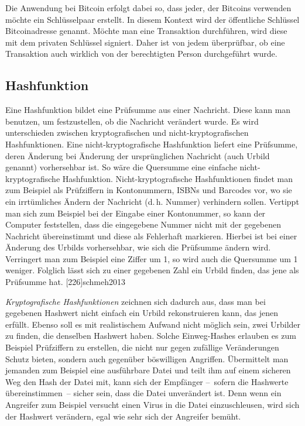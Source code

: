 Die Anwendung bei Bitcoin erfolgt dabei so, dass jeder, der Bitcoins verwenden möchte ein Schlüsselpaar erstellt.
In diesem Kontext wird der öffentliche Schlüssel Bitcoinadresse genannt.
Möchte man eine Transaktion durchführen, wird diese mit dem privaten Schlüssel signiert.
Daher ist von jedem überprüfbar, ob eine Transaktion auch wirklich von der berechtigten Person durchgeführt wurde.

\subsection{Hashfunktion}

Eine Hashfunktion bildet eine Prüfsumme aus einer Nachricht.
Diese kann man benutzen, um festzustellen, ob die Nachricht verändert wurde.
Es wird unterschieden zwischen kryptografischen und nicht-kryptografischen Hashfunktionen.
Eine nicht-kryptografische Hashfunktion liefert eine Prüfsumme, deren Änderung bei Änderung der ursprünglichen Nachricht (auch Urbild genannt) vorhersehbar ist.
So wäre die Quersumme eine einfache nicht-kryptografische Hashfunktion.
Nicht-kryptografische Hashfunktionen findet man zum Beispiel als Prüfziffern in Kontonummern, ISBNs und Barcodes vor, wo sie ein irrtümliches Ändern der Nachricht (d.\,h. Nummer) verhindern sollen.
Vertippt man sich zum Beispiel bei der Eingabe einer Kontonummer, so kann der Computer feststellen, dass die eingegebene Nummer nicht mit der gegebenen Nachricht übereinstimmt und diese als Fehlerhaft markieren.
Hierbei ist bei einer Änderung des Urbilds vorhersehbar, wie sich die Prüfsumme ändern wird.
Verringert man zum Beispiel eine Ziffer um 1, so wird auch die Quersumme um 1 weniger.
Folglich lässt sich zu einer gegebenen Zahl ein Urbild finden, das jene als Prüfsumme hat.
[226]{schmeh2013}

\emph{Kryptografische Hashfunktionen} zeichnen sich dadurch aus, dass man bei gegebenen Hashwert nicht einfach ein Urbild rekonstruieren kann, das jenen erfüllt.
Ebenso soll es mit realistischem Aufwand nicht möglich sein, zwei Urbilder zu finden, die denselben Hashwert haben.
Solche Einweg-Hashes erlauben es zum Beispiel Prüfziffern zu erstellen, die nicht nur gegen zufällige Veränderungen Schutz bieten, sondern auch gegenüber böswilligen Angriffen.
Übermittelt man jemanden zum Beispiel eine ausführbare Datei und teilt ihm auf einem sicheren Weg den Hash der Datei mit, kann sich der Empfänger --~sofern die Hashwerte übereinstimmen~-- sicher sein, dass die Datei unverändert ist.
Denn wenn ein Angreifer zum Beispiel versucht einen Virus in die Datei einzuschleusen, wird sich der Hashwert verändern, egal wie sehr sich der Angreifer bemüht.
